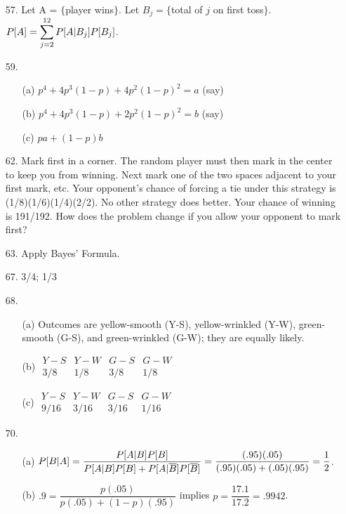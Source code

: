 \begin{enumerate}
	\item[57.] Let A = $\{$player wins$\}$.  Let $B_j = \{$total of $j$ on first toss$\}$. \\
	$\displaystyle P[A] = \sum_{j=2}^{12}P[A\vert B_j]P[B_j]$.
	
	\item[59.] \begin{enumerate}
		\item[(a)] $p^4 + 4p^3(1-p) + 4p^2(1-p)^2 = a$ (say)
		\item[(b)] $p^4 +4p^3(1-p) +2p^2(1-p)^2 =b$ (say)
		\item[(c)] $pa + (1-p)b$		
	\end{enumerate}

	\item[62.] Mark first in a corner.  The random player must then mark in the center to keep you from winning.  Next mark one of the two spaces adjacent to your first mark, etc.  Your opponent's chance of forcing a tie under this strategy is (1/8)(1/6)(1/4)(2/2).  No other strategy does better.  Your chance of winning is 191/192.  How does the problem change if you allow your opponent to mark first?
	
	\item[63.] Apply Bayes' Formula.
	
	\item[67.] 3/4; 1/3

	\item[68.] \begin{enumerate}
		\item[(a)] Outcomes are yellow-smooth (Y-S), yellow-wrinkled (Y-W), green-smooth (G-S), and green-wrinkled (G-W); they are equally likely.
		\item[(b)] $\begin{array}{c|c|c|c}
			Y-S & Y-W & G-S & G-W \\ \hline
			3/8 & 1/8 & 3/8 & 1/8 
		\end{array}$
		\item[(c)] $\begin{array}{c|c|c|c}
			Y-S & Y-W & G-S & G-W \\ \hline
			9/16 & 3/16 & 3/16 & 1/16 
		\end{array}$
	\end{enumerate}

	\item[70.] \begin{enumerate}
		\item[(a)] $\displaystyle P[B\vert A] = \dfrac{P[A\vert B]P[B]}{P[A\vert B]P[B] +P[A\vert \overline{B}]P[\overline{B}]} = \dfrac{(.95)(.05)}{(.95)(.05) + (.05)(.95)} = \dfrac{1}{2}$.
		\item[(b)] $.9 = \dfrac{p(.05)}{p(.05) + (1-p)(.95)}$ implies $p=\dfrac{17.1}{17.2} = .9942$.
	\end{enumerate}

\end{enumerate}







